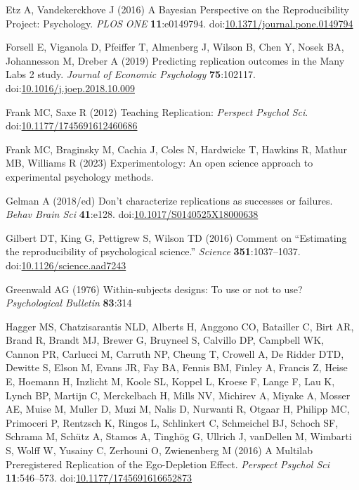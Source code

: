 \documentclass[
  english,
  a4paper,
]{article}
\newlength{\cslhangindent}
\newlength{\cslentryspacingunit} %
\newenvironment{CSLReferences}[2] %
 {%
  \setlength{\parindent}{0pt}
  \ifodd #1
  \let\oldpar\par
  \def\par{\hangindent=\cslhangindent\oldpar}
  \fi
  \setlength{\parskip}{#2\cslentryspacingunit}
 }%
 {}
\begin{document}
\begin{CSLReferences}{1}{0}
\leavevmode{}%
Etz A, Vandekerckhove J (2016) A {Bayesian Perspective} on the {Reproducibility Project}: {Psychology}. \emph{PLOS ONE} \textbf{11}:e0149794. doi:\href{https://doi.org/10.1371/journal.pone.0149794}{10.1371/journal.pone.0149794}

\leavevmode{}%
Forsell E, Viganola D, Pfeiffer T, Almenberg J, Wilson B, Chen Y, Nosek BA, Johannesson M, Dreber A (2019) Predicting replication outcomes in the {Many Labs} 2 study. \emph{Journal of Economic Psychology} \textbf{75}:102117. doi:\href{https://doi.org/10.1016/j.joep.2018.10.009}{10.1016/j.joep.2018.10.009}

\leavevmode{}%
Frank MC, Saxe R (2012) Teaching {Replication}: \emph{Perspect Psychol Sci}. doi:\href{https://doi.org/10.1177/1745691612460686}{10.1177/1745691612460686}

\leavevmode{}%
Frank MC, Braginsky M, Cachia J, Coles N, Hardwicke T, Hawkins R, Mathur MB, Williams R (2023) Experimentology: An open science approach to experimental psychology methods.

\leavevmode{}%
Gelman A (2018/ed) Don't characterize replications as successes or failures. \emph{Behav Brain Sci} \textbf{41}:e128. doi:\href{https://doi.org/10.1017/S0140525X18000638}{10.1017/S0140525X18000638}

\leavevmode{}%
Gilbert DT, King G, Pettigrew S, Wilson TD (2016) Comment on {``{Estimating} the reproducibility of psychological science.''} \emph{Science} \textbf{351}:1037--1037. doi:\href{https://doi.org/10.1126/science.aad7243}{10.1126/science.aad7243}

\leavevmode{}%
Greenwald AG (1976) Within-subjects designs: To use or not to use? \emph{Psychological Bulletin} \textbf{83}:314

\leavevmode{}%
Hagger MS, Chatzisarantis NLD, Alberts H, Anggono CO, Batailler C, Birt AR, Brand R, Brandt MJ, Brewer G, Bruyneel S, Calvillo DP, Campbell WK, Cannon PR, Carlucci M, Carruth NP, Cheung T, Crowell A, De Ridder DTD, Dewitte S, Elson M, Evans JR, Fay BA, Fennis BM, Finley A, Francis Z, Heise E, Hoemann H, Inzlicht M, Koole SL, Koppel L, Kroese F, Lange F, Lau K, Lynch BP, Martijn C, Merckelbach H, Mills NV, Michirev A, Miyake A, Mosser AE, Muise M, Muller D, Muzi M, Nalis D, Nurwanti R, Otgaar H, Philipp MC, Primoceri P, Rentzsch K, Ringos L, Schlinkert C, Schmeichel BJ, Schoch SF, Schrama M, Schütz A, Stamos A, Tinghög G, Ullrich J, vanDellen M, Wimbarti S, Wolff W, Yusainy C, Zerhouni O, Zwienenberg M (2016) A {Multilab Preregistered Replication} of the {Ego-Depletion Effect}. \emph{Perspect Psychol Sci} \textbf{11}:546--573. doi:\href{https://doi.org/10.1177/1745691616652873}{10.1177/1745691616652873}


\end{CSLReferences}
\end{document}
